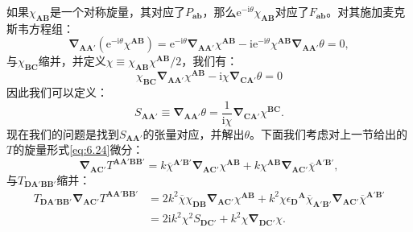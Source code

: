 如果$\chi _{\boldsymbol{AB}}$是一个对称旋量，其对应了$P_{\boldsymbol{ab}}$，那么$\mathrm{e}^{-\mathrm{i} \theta } \chi _{\boldsymbol{AB}}$对应了$F_{\boldsymbol{ab}}$。对其施加麦克斯韦方程组：
\begin{equation*}
	\boldsymbol{\nabla }_{\boldsymbol{AA} '} (\mathrm{e}^{-\mathrm{i} \theta } \chi ^{\boldsymbol{AB}} )=\mathrm{e}^{-\mathrm{i} \theta }\boldsymbol{\nabla }_{\boldsymbol{AA} '} \chi ^{\boldsymbol{AB}} -\mathrm{ie}^{-\mathrm{i} \theta } \chi ^{\boldsymbol{AB}}\boldsymbol{\nabla }_{\boldsymbol{AA} '} \theta =0,
\end{equation*}
与$\chi _{\boldsymbol{BC}}$缩并，并定义$\chi \equiv \chi _{\boldsymbol{AB}} \chi ^{\boldsymbol{AB}} /2$，我们有：
\begin{equation*}
	\chi _{\boldsymbol{BC}}\boldsymbol{\nabla }_{\boldsymbol{AA} '} \chi ^{\boldsymbol{AB}} -\mathrm{i} \chi \boldsymbol{\nabla }_{\boldsymbol{CA} '} \theta =0
\end{equation*}
因此我们可以定义：
\begin{equation}
	S_{\boldsymbol{AA} '} \equiv \boldsymbol{\nabla }_{\boldsymbol{AA} '} \theta =\frac{1}{\mathrm{i} \chi }\boldsymbol{\nabla }_{\boldsymbol{CA} '} \chi ^{\boldsymbol{BC}} .
	\label{eq:6.25}
\end{equation}
现在我们的问题是找到$S_{\boldsymbol{AA} '}$的张量对应，并解出$\theta $。下面我们考虑对上一节给出的$T$的旋量形式\ref{eq:6.24}微分：
\begin{equation*}
	\boldsymbol{\nabla }_{\boldsymbol{AC} '} T^{\boldsymbol{AA} '\boldsymbol{BB} '} =k\overline{\chi }^{\boldsymbol{A} '\boldsymbol{B} '}\boldsymbol{\nabla }_{\boldsymbol{AC} '} \chi ^{\boldsymbol{AB}} +k\chi ^{\boldsymbol{AB}}\boldsymbol{\nabla }_{\boldsymbol{AC} '}\overline{\chi }^{\boldsymbol{A} '\boldsymbol{B} '} ,
\end{equation*}
与$T_{\boldsymbol{DA} '\boldsymbol{BB} '}$缩并：
\begin{equation*}
	\begin{aligned}
		T_{\boldsymbol{DA} '\boldsymbol{BB} '}\boldsymbol{\nabla }_{\boldsymbol{AC} '} T^{\boldsymbol{AA} '\boldsymbol{BB} '} & =2k^{2}\overline{\chi } \chi _{\boldsymbol{DB}}\boldsymbol{\nabla }_{\boldsymbol{AC} '} \chi ^{\boldsymbol{AB}} +k^{2} \chi \epsilon {_{\boldsymbol{D}}}^{\boldsymbol{A}}\overline{\chi }_{\boldsymbol{A} '\boldsymbol{B} '}\boldsymbol{\nabla }_{\boldsymbol{AC} '}\overline{\chi }^{\boldsymbol{A} '\boldsymbol{B} '}\\
		& =2\mathrm{i} k^{2} \chi ^{2} S_{\boldsymbol{DC} '} +k^{2} \chi \boldsymbol{\nabla }_{\boldsymbol{DC} '} \chi .
	\end{aligned}
\end{equation*}
